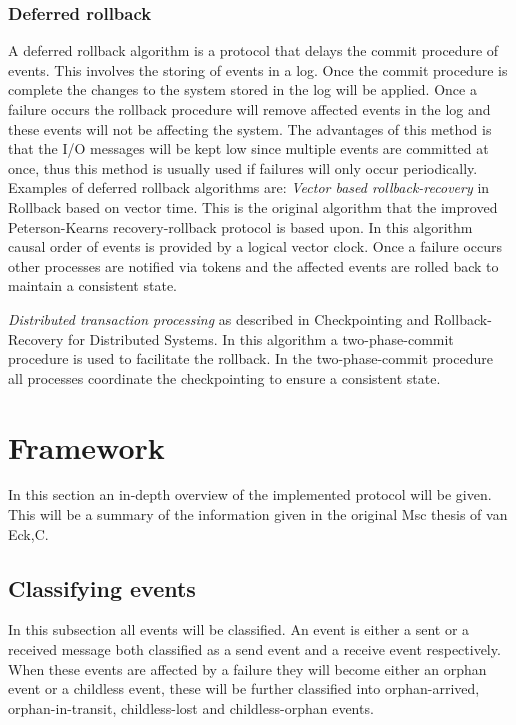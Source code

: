 \documentclass[twocolumn, a4paper,11pt]{article}%
\begin{document}
\subsubsection*{Deferred rollback}
\par A deferred rollback algorithm is a protocol that delays the commit procedure of events. This involves the storing of events in a log. Once the commit procedure is complete the changes to the system stored in the log will be applied. Once a failure occurs the rollback procedure will remove affected events in the log and these events will not be affecting the system.   The advantages of this method is that the I/O messages will be kept low since multiple events are committed at once, thus this method is usually used if failures will  only occur periodically. Examples of deferred rollback algorithms are:
\textit{Vector based rollback-recovery} in Rollback based on vector time\cite{peterson1993rollback}. This is the original algorithm that the improved Peterson-Kearns recovery-rollback\cite{van2023optimistic} protocol is based upon. In this algorithm causal order of events is provided by a logical vector clock.  Once a failure occurs other processes are notified via tokens and the affected events are rolled back to maintain a consistent state.
\par \textit{Distributed transaction processing} as described in Checkpointing and Rollback-Recovery for Distributed Systems\cite{koo1987checkpointing}.  In this algorithm a two-phase-commit procedure is used to facilitate the rollback.  In the two-phase-commit procedure all processes coordinate the checkpointing to ensure a consistent state.



\section{Framework}
In this section an in-depth overview of the implemented protocol will be given.  This will be a summary of the information given in the original Msc thesis of van Eck,C\cite{van2023optimistic}.
\subsection{Classifying events}
\par  In this subsection all events will be classified. An event is either a sent or a received message both classified as a send event and a receive event respectively. When these events are affected by a failure they will become either an orphan event or a childless event, these will be further classified into orphan-arrived, orphan-in-transit, childless-lost and childless-orphan events.
\end{document}
